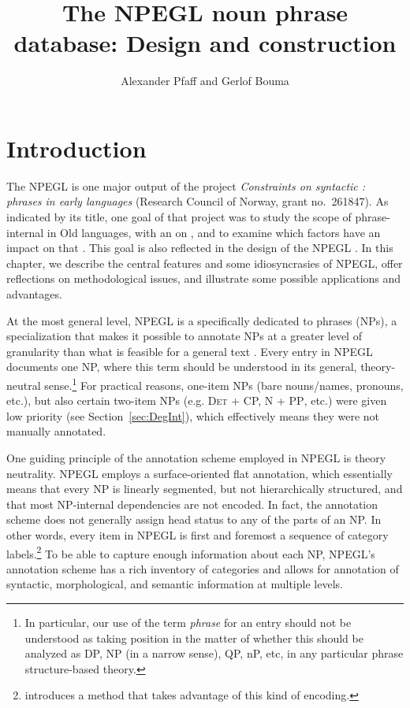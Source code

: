 \documentclass[output=paper,colorlinks,citecolor=brown]{langscibook}
\author{Alexander Pfaff\affiliation{University of Stuttgart} and Gerlof Bouma\affiliation{University of Gothenburg}}
\title{The NPEGL noun phrase database: Design and construction}
\begin{document}
\maketitle


\section{Introduction}

 
 
The NPEGL  is one major output of the project \textit{Constraints on syntactic :  phrases in early  languages} (Research Council of Norway, grant no.\ 261847).     
As indicated by its title, one goal of that project was to study the scope of  phrase-internal  in Old  languages, with an  on  , and to examine which factors have an impact on that .  This goal is also reflected in the design of the NPEGL .  
In this chapter, we describe the central features and some idiosyncrasies of NPEGL, 
offer reflections on methodological issues, and illustrate some possible applications and advantages.  

At the most general level, NPEGL is a  specifically dedicated to  phrases (NPs), a specialization that makes it possible to annotate NPs at a greater level of granularity than what is feasible for a general text .  Every entry in NPEGL documents one NP, where this term should be understood in its general, theory-neutral sense.\footnote{In particular, our use of the term \textit{ phrase} for an entry should not be understood as taking position in the matter of whether this should be analyzed as DP, NP (in a narrow sense), QP, nP, etc, in any particular phrase structure-based theory.} 
For practical reasons,  one-item NPs (bare nouns/names, pronouns, etc.), but also certain two-item NPs (e.g. \textsc{Det + CP, N + PP}, etc.)  were given low priority  (see Section~\ref{sec:DegInt}), which effectively means they were not manually annotated.

One guiding principle of the annotation scheme employed in NPEGL is theory neutrality. NPEGL employs a surface-oriented flat annotation, which essentially means that every NP is linearly segmented, but not hierarchically structured, and that most NP-internal dependencies are not encoded. In fact, the annotation scheme does not generally assign head status to any of the parts of an NP. In other words, every  item in NPEGL is first and foremost a sequence of category labels.\footnote{ introduces a method that takes advantage of this kind of encoding. } To be able to capture enough information about each NP, NPEGL's annotation scheme has a rich inventory of categories and allows for annotation of syntactic, morphological, and semantic information at multiple levels.
\end{document}
